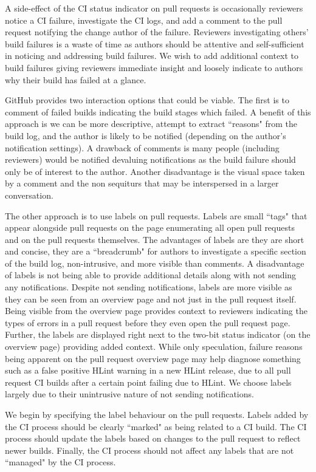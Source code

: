{{{{{A side-effect of the CI status indicator on pull requests is occasionally reviewers notice a CI failure, investigate the CI logs, and add a comment to the pull request notifying the change author of the failure. Reviewers investigating others' build failures is a waste of time as authors should be attentive and self-sufficient in noticing and addressing build failures. We wish to add additional context to build failures giving reviewers immediate insight and loosely indicate to authors why their build has failed at a glance.

GitHub provides two interaction options that could be viable. The first is to comment of failed builds indicating the build stages which failed. A benefit of this approach is we can be more descriptive, attempt to extract ``reasons" from the build log, and the author is likely to be notified (depending on the author's notification settings). A drawback of comments is many people (including reviewers) would be notified devaluing notifications as the build failure should only be of interest to the author. Another disadvantage is the visual space taken by a comment and the non sequiturs that may be interspersed in a larger conversation.

The other approach is to use labels on pull requests. Labels are small ``tags" that appear alongside pull requests on the page enumerating all open pull requests and on the pull requests themselves. The advantages of labels are they are short and concise, they are a ``breadcrumb" for authors to investigate a specific section of the build log, non-intrusive, and more visible than comments. A disadvantage of labels is not being able to provide additional details along with not sending any notifications. Despite not sending notifications, labels are more visible as they can be seen from an overview page and not just in the pull request itself. Being visible from the overview page provides context to reviewers indicating the types of errors in a pull request before they even open the pull request page. Further, the labels are displayed right next to the two-bit status indicator (on the overview page) providing added context. While only speculation, failure reasons being apparent on the pull request overview page may help diagnose something such as a false positive HLint warning in a new HLint release, due to all pull request CI builds after a certain point failing due to HLint. We choose labels largely due to their unintrusive nature of not sending notifications. 

We begin by specifying the label behaviour on the pull requests. Labels added by the CI process should be clearly ``marked" as being related to a CI build. The CI process should update the labels based on changes to the pull request to reflect newer builds. Finally, the CI process should not affect any labels that are not ``managed" by the CI process. 

}}}}}
